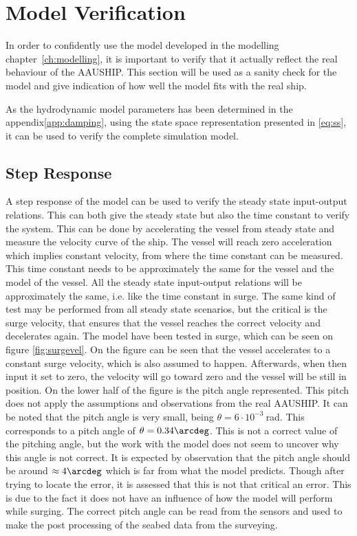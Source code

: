 \section{Model Verification}
\label{sec:model_verification}
In order to confidently use the model developed in the modelling chapter~\vref{ch:modelling}, it is important to verify that it actually reflect the real behaviour of the AAUSHIP. This section will be used as a sanity check for the model and give indication of how well the model fits with the real ship.

As the hydrodynamic model parameters has been determined in the appendix\vref{app:damping}, using the state space representation presented in \vref{eq:ss}, it can be used to verify the complete simulation model.

\subsection{Step Response}
A step response of the model can be used to verify the steady state input-output relations. This can both give the steady state but also the time constant to verify the system. This can be done by accelerating the vessel from steady state and measure the velocity curve of the ship. The vessel will reach zero acceleration which implies constant velocity, from where the time constant can be measured. This time constant needs to be approximately the same for the vessel and the model of the vessel. All the steady state input-output relations will be approximately the same, i.e. like the time constant in surge. The same kind of test may be performed from all steady state scenarios, but the critical is the surge velocity, that ensures that the vessel reaches the correct velocity and decelerates again. The model have been tested in surge, which can be seen on figure \ref{fig:surgevel}. On the figure can be seen that the vessel accelerates to a constant surge velocity, which is also assumed to happen. Afterwards, when then input it set to zero, the velocity will go toward zero and the vessel will be still in position. On the lower half of the figure is the pitch angle represented. This pitch does not apply the assumptions and observations from the real AAUSHIP. It can be noted that the pitch angle is very small, being $\theta = 6\cdot 10^{-3}\ $rad. This corresponds to a pitch angle of $\theta = 0.34\arcdeg$. This is not a correct value of the pitching angle, but the work with the model does not seem to uncover why this angle is not correct. It is expected by observation that the pitch angle should be around $\approx 4 \arcdeg$ which is far from what the model predicts. Though after trying to locate the error, it is assessed that this is not that critical an error. This is due to the fact it does not have an influence of how the model will perform while surging. The correct pitch angle can be read from the sensors and used to make the post processing of the seabed data from the surveying.


